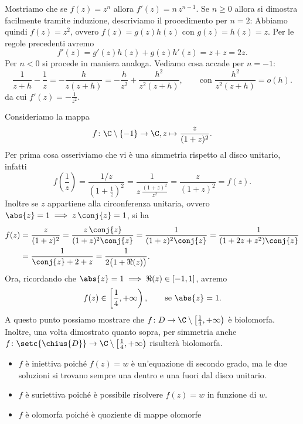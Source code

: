 \begin{ese}
	Mostriamo che se \(f(z)=z^n\) allora \(f'(z) = n\,z^{n-1}\).
	Se \(n\ge 0\) allora si dimostra facilmente tramite induzione, descriviamo il procedimento per \(n=2\):
	Abbiamo quindi \(f(z) = z^2\), ovvero \(f(z)=g(z)h(z)\) con \(g(z)=h(z)=z\).
	Per le regole precedenti avremo
	\[
		f'(z) = g'(z)h(z)+g(z)h'(z) = z+z = 2z.
	\]
	Per \(n<0\) si procede in maniera analoga. Vediamo cosa accade per \(n=-1\):
	\[
		\frac{1}{z+h}-\frac{1}{z} = -\frac{h}{z(z+h)} = -\frac{h}{z^2} + \frac{h^2}{z^2(z+h)}, \qquad\text{con } \frac{h^2}{z^2(z+h)} = o(h).
	\]
	da cui \(f'(z)= -\frac{1}{z^2}\).
\end{ese}
%
%
\begin{ese}\label{es:mappaKoebe}
	Consideriamo la mappa
	\[
		f\colon \C\setminus\{-1\} \to \C, z \mapsto \frac{z}{(1+z)^2}.
	\]
	Per prima cosa osseriviamo che vi è una simmetria rispetto al disco unitario, infatti
	\[
		f \left( \frac{1}{z} \right) = \frac{1/z}{\left( 1+ \frac{1}{z} \right)^2} = \frac{1}{z\, \frac{(1+z)^2}{z^2}} = \frac{z}{(1+z)^2} = f(z).
	\]
	Inoltre se \(z\) appartiene alla circonferenza unitaria, ovvero \(\abs{z} = 1 \implies z\,\conj{z}=1\), si ha
	\[
		\begin{split}
			f(z) & = \frac{z}{(1+z)^2} = \frac{z\,\conj{z}}{(1+z)^2 \conj{z}} = \frac{1}{(1+z)^2 \conj{z}} = \frac{1}{(1+2z+z^2)\conj{z}}\\
			& = \frac{1}{\conj{z}+2+z} = \frac{1}{2\big(1+\Re(z)\big)}.
		\end{split}
	\]
	Ora, ricordando che \(\abs{z}=1 \implies \Re(z) \in [-1,1]\), avremo
	\[
		f(z) \in \left[\frac{1}{4}, +\infty\right), \qquad\text{se }\abs{z}=1.
	\]
	A questo punto possiamo mostrare che \(f\colon D \to \C\setminus\left[\frac{1}{4},+\infty\right)\) è biolomorfa.
	Inoltre, una volta dimostrato quanto sopra, per simmetria anche \(f\colon \setc{\chius{D}} \to \C\setminus \left[\frac{1}{4},+\infty\right)\) risulterà biolomorfa.
	\begin{itemize}
		\item \(f\) è iniettiva poiché \(f(z)=w\) è un'equazione di secondo grado, ma le due soluzioni si trovano sempre una dentro e una fuori dal disco unitario.
		\item \(f\) è suriettiva poiché è possibile risolvere \(f(z)=w\) in funzione di \(w\).
		\item \(f\) è olomorfa poiché è quoziente di mappe olomorfe

\end{itemize}
\end{ese}
